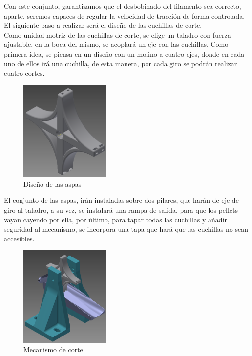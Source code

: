 Con este conjunto, garantizamos que el desbobinado del filamento sea correcto, aparte, seremos capaces de regular la velocidad de tracción de forma controlada. El siguiente paso a realizar será el diseño de las cuchillas de corte.\\

Como unidad motriz de las cuchillas de corte, se elige un taladro con fuerza ajustable, en la boca del mismo, se acoplará un eje con las cuchillas. Como primera idea, se piensa en un diseño con un molino a cuatro ejes, donde en cada uno de ellos irá una cuchilla, de esta manera, por cada giro se podrán realizar cuatro cortes.

\begin{figure}[H]
    \centering
    \includegraphics[width=0.4\textwidth]{images/peletizadora/aspas.png}
    \caption{Diseño de las aspas}
    \label{fig:peletizadora_aspas}
\end{figure}

El conjunto de las aspas, irán instaladas sobre dos pilares, que harán de eje de giro al taladro, a su vez, se instalará una rampa de salida, para que los pellets vayan cayendo por ella, por último, para tapar todas las cuchillas y añadir seguridad al mecanismo, se incorpora una tapa que hará que las cuchillas no sean accesibles.


\begin{figure}[H]
    \centering
    \includegraphics[width=0.4\textwidth]{images/peletizadora/corte.png}
    \caption{Mecanismo de corte}
    \label{fig:peletizadora_corte}
\end{figure}

